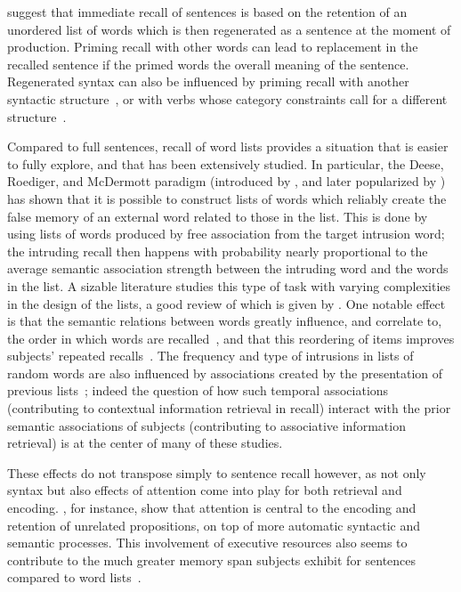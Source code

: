 \begin{new}

\citet{potter_regeneration_1990} suggest that immediate recall of sentences is based on the retention of an unordered list of words which is then regenerated as a sentence at the moment of production.
Priming recall with other words can lead to replacement in the recalled sentence if the primed words  the overall meaning of the sentence.
Regenerated syntax can also be influenced by priming recall with another syntactic structure~\citep{potter_syntactic_1998}, or with verbs whose category constraints call for a different structure~\citep{lombardi_regeneration_1992}.

Compared to full sentences, recall of word lists provides a situation that is easier to fully explore, and that has been extensively studied.
In particular, the Deese, Roediger, and McDermott paradigm (introduced by \citealp{deese_prediction_1959}, and later popularized by \citealp{roediger_creating_1995}) has shown that it is possible to construct lists of words which reliably create the false memory of an external word related to those in the list.
This is done by using lists of words produced by free association from the target intrusion word;
the intruding recall then happens with probability nearly proportional to the average semantic association strength between the intruding word and the words in the list.
A sizable literature studies this type of task with varying complexities in the design of the lists, a good review of which is given by \citet{zaromb_temporal_2006}.
One notable effect is that the semantic relations between words greatly influence, and correlate to, the order in which words are recalled~\citep{tulving_subjective_1962,howard_when_2002}, and that this reordering of items improves subjects' repeated recalls~\citep{tulving_subjective_1966}.
The frequency and type of intrusions in lists of random words are also influenced by associations created by the presentation of previous lists~\citep{zaromb_temporal_2006};
indeed the question of how such temporal associations (contributing to contextual information retrieval in recall) interact with the prior semantic associations of subjects (contributing to associative information retrieval) is at the center of many of these studies.

These effects do not transpose simply to sentence recall however, as not only syntax but also effects of attention come into play for both retrieval and encoding.
\citet{jefferies_automatic_2004}, for instance, show that attention is central to the encoding and retention of unrelated propositions, on top of more automatic syntactic and semantic processes.
This involvement of executive resources also seems to contribute to the much greater memory span subjects exhibit for sentences compared to word lists~\citep[see][again, for more details]{jefferies_automatic_2004}.

\end{new}


